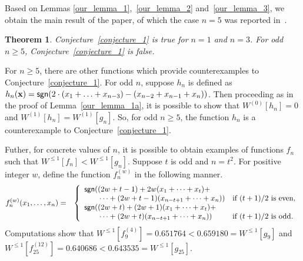 \documentclass[11pt]{article}
\newtheorem{theorem}{Theorem}
\newcommand{\sym}[1]{{\sf #1}}
\begin{document}
Based on Lemmas \ref{our_lemma_1},~\ref{our_lemma_2} and~\ref{our_lemma_3}, we obtain the main result of the paper, of which the case $n=5$ was 
reported in~\cite{jain2017counterexample}.
\begin{theorem}\label{main_theorem}
Conjecture~\ref{conjecture_1} is true for $n=1$ and $n=3$. For odd $n\geq 5$, Conjecture~\ref{conjecture_1} is false.
\end{theorem}

For $n\geq 5$, there are other functions which provide counterexamples to Conjecture~\ref{conjecture_1}.
For odd $n$, suppose $h_n$ is defined as $h_n(\mathbf{x})=\sym{sgn}(2\cdot(x_1+\ldots+x_{n-3})-(x_{n-2}+x_{n-1}+x_n))$. Then proceeding as in the proof of Lemma~\ref{our_lemma_1a},
it is possible to show that ${W}^{(0)}[h_n] =0$ and ${W}^{(1)}[h_{n}]={W}^{(1)}[g_{n}]$. So, for odd $n\geq 5$, the function $h_n$ is a counterexample to
Conjecture~\ref{conjecture_1}. 

Futher, for concrete values of $n$, it is possible to obtain examples of functions $f_n$ such that $W^{\leq 1}[f_n] < W^{\leq 1}[g_n]$. Suppose $t$ is odd and
$n=t^2$. For positive integer $w$, define the function $f_n^{(w)}$ in the following manner.
\begin{eqnarray*}
	f_n^{(w)}(x_1,\ldots,x_n)
	& = & \left\{
		\begin{array}{ll}
			\sym{sgn}((2w+t-1)+2w(x_1+\cdots+x_{t})+ \\
			\qquad \cdots+(2w+t-1)(x_{n-t+1}+\cdots+x_n)) & \text{if $(t+1)/2$ is even}, \\
			\sym{sgn}((2w+t)+(2w+1)(x_1+\cdots+x_{t})+\\
			\qquad \cdots+(2w+t)(x_{n-t+1}+\cdots+x_n)) & \text{if $(t+1)/2$ is odd.}
		\end{array}
		\right.
\end{eqnarray*}
Computations show that
$W^{\leq 1}[f_9^{(4)}] = 0.651764 < 0.659180 = W^{\leq 1}[g_9]$ and $W^{\leq 1}[f_{25}^{(12)}] = 0.640686 < 0.643535 = W^{\leq 1}[g_{25}]$.
\end{document}
